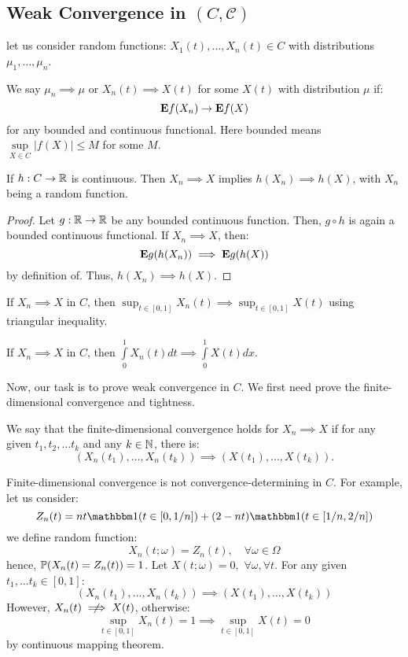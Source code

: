 \documentclass[../main/main.tex]{subfiles}
\begin{document}
\subsection{Weak Convergence in $(C,\mathscr{C})$}
let us consider random functions: $X_1(t), \ldots , X_n(t) \in C$ with distributions $\mu_1, \ldots , \mu_n$.

\begin{definition}  We say $\mu_n \implies \mu$ or $X_n(t) \implies X(t)$ for some $X(t) $ with distribution $\mu$ if: \[
		\E f(X_n) \to \E f(X)
	\] for any bounded and continuous functional. Here bounded means $\sup\limits_{X \in C} |f(X)| \leq M$ for some $M$.
\end{definition}

\begin{theorem} If $h : C \to \R$ is continuous. Then $X_{n} \implies X$ implies $h(X_n) \implies h(X)$, with $X_n$ being a random function.
\end{theorem}
\begin{proof}
	Let $g: \R \to \R$ be any bounded continuous function. Then, $g \circ h$ is again a bounded continuous functional. If $X_n \implies X$, then: \[
		\E g(h(X_n)) \implies \E g(h(X))
	\] by definition of. Thus, $h(X_n) \implies h(X)$.
\end{proof}
\begin{example}
	If $X_n \implies X$ in $C$, then $ \sup_{t \in [0,1]} X_n(t) \implies \sup_{t \in [0,1]} X(t) $ using triangular inequality.
\end{example}
\begin{example}
	If $X_n \implies X$ in $C$, then $\int\limits_{0}^{1} X_n(t) dt \implies \int\limits_{0}^{1} X(t) dx$.
\end{example}

Now, our task is to prove weak convergence in $C$. We first need prove the finite-dimensional convergence and tightness.

\begin{definition}
	We say that the finite-dimensional convergence holds for $X_n \implies X$ if for any given $t_1, t_2, \ldots t_k$ and any $k \in \N$, there is: \[
		(X_n(t_1) ,\ldots, X_n(t_k)) \implies (X(t_1), \ldots , X(t_k)).
	\]
\end{definition}

\begin{remark}
	Finite-dimensional convergence is not convergence-determining in $C$. For example, let us consider: \[
		Z_n(t) = nt \ind(t \in [0, 1 / n]) + (2-nt) \ind (t \in [1 / n , 2 / n])
	\]
	we define random function: \[
		X_n(t; \omega) = Z_n(t) , \quad \forall \omega \in \Omega
	\] hence, $\P (X_n(t) = Z_n(t)) = 1$.
	Let $X(t; \omega) = 0, \,\, \forall \omega, \forall t$. For any given $t_1, \ldots t_k \in [0,1]$: \[
		(X_n(t_1) ,\ldots, X_n(t_k)) \implies (X(t_1), \ldots , X(t_k))
	\] However, $X_n(t)  \centernot\implies X(t)$, otherwise: \[
		\sup_{t \in [0,1]} X_n(t) = 1 \implies \sup_{t \in [0,1]} X(t) = 0
	\] by continuous mapping theorem.

\end{remark}
\end{document}
